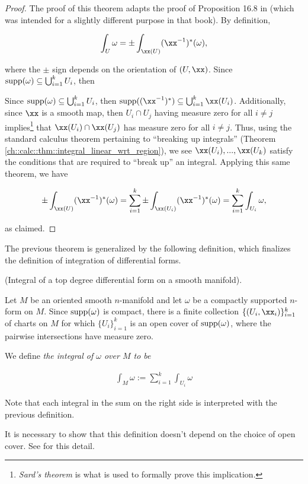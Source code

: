 \begin{proof}
    The proof of this theorem adapts the proof of Proposition 16.8 in \cite{book::SM} (which was intended for a slightly different purpose in that book). By definition,
    
    \begin{align*}
        \int_U \omega = \pm \int_{\xx(U)} (\xx^{-1})^*(\omega),
    \end{align*}
    
    where the $\pm$ sign depends on the orientation of $(U, \xx)$. Since $\text{supp}(\omega) \subseteq \bigcup_{i = 1}^k U_i$, then
    
    Since $\text{supp}(\omega) \subseteq \bigcup_{i = 1}^k U_i$, then $\supp((\xx^{-1})^*) \subseteq \bigcup_{i = 1}^k \xx(U_i)$. Additionally, since $\xx$ is a smooth map, then $U_i \cap U_j$ having measure zero for all $i \neq j$ implies\footnote{\textit{Sard's theorem} is what is used to formally prove this implication.} that $\xx(U_i) \cap \xx(U_j)$ has measure zero for all $i \neq j$. Thus, using the standard calculus theorem pertaining to ``breaking up integrals'' (Theorem \ref{ch::calc::thm::integral_linear_wrt_region}), we see $\xx(U_i), ..., \xx(U_k)$ satisfy the conditions that are required to ``break up'' an integral. Applying this same theorem, we have
    
    \begin{align*}
        \pm \int_{\xx(U)} (\xx^{-1})^*(\omega) 
        = \sum_{i = 1}^k \pm \int_{\xx(U_i)} (\xx^{-1})^*(\omega)
        = \sum_{i = 1}^k \int_{U_i} \omega,
    \end{align*}
    
    as claimed.
\end{proof}

The previous theorem is generalized by the following definition, which finalizes the definition of integration of differential forms.

\begin{defn}
\label{ch::diff_forms::defn::integral_over_manifold}
     (Integral of a top degree differential form on a smooth manifold).
    
    Let $M$ be an oriented smooth $n$-manifold and let $\omega$ be a compactly supported $n$-form on $M$. Since $\text{supp}(\omega)$ is compact, there is a finite collection $\{(U_i, \xx_i)\}_{i = 1}^k$ of charts on $M$ for which $\{U_i\}_{i = 1}^k$ is an open cover of $\text{supp}(\omega)$, where the pairwise intersections have measure zero.
    
    We define \textit{the integral of $\omega$ over $M$ to be}
    
    \begin{align*}
        \boxed
        {
            \int_M \omega := \sum_{i = 1}^k \int_{U_i} \omega
        }
    \end{align*}
    
    Note that each integral in the sum on the right side is interpreted with the previous definition.
    
    It is necessary to show that this definition doesn't depend on the choice of open cover. See \cite{Lee} for this detail.
\end{defn}

